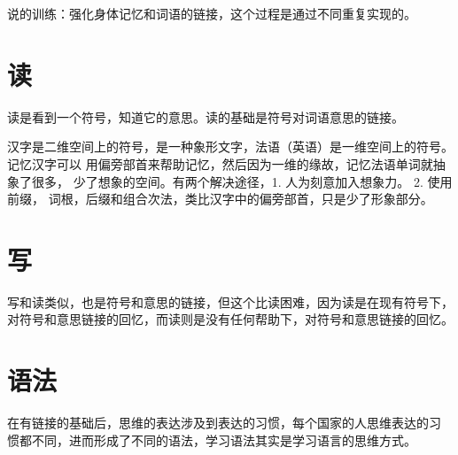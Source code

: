说的训练：强化身体记忆和词语的链接，这个过程是通过不同重复实现的。



\section{读}

读是看到一个符号，知道它的意思。读的基础是符号对词语意思的链接。

汉字是二维空间上的符号，是一种象形文字，法语（英语）是一维空间上的符号。记忆汉字可以
用偏旁部首来帮助记忆，然后因为一维的缘故，记忆法语单词就抽象了很多，
少了想象的空间。有两个解决途径，1. 人为刻意加入想象力。 2. 使用前缀，
词根，后缀和组合次法，类比汉字中的偏旁部首，只是少了形象部分。



\section{写}

写和读类似，也是符号和意思的链接，但这个比读困难，因为读是在现有符号下，
对符号和意思链接的回忆，而读则是没有任何帮助下，对符号和意思链接的回忆。





\section{语法}

在有链接的基础后，思维的表达涉及到表达的习惯，每个国家的人思维表达的习
惯都不同，进而形成了不同的语法，学习语法其实是学习语言的思维方式。







